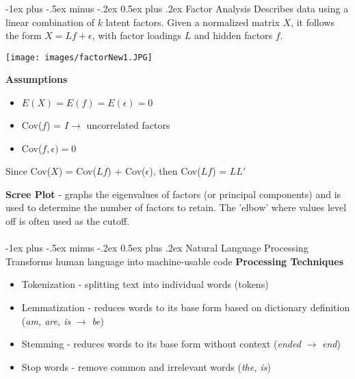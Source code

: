\documentclass[10pt,landscape]{article}
\makeatletter
\renewcommand{\section}{\@startsection{section}{1}{0mm}%
                                {-1ex plus -.5ex minus -.2ex}%
                                {0.5ex plus .2ex}%
                                {\normalfont\large\bfseries}}
\renewcommand{\subsection}{\@startsection{subsection}{2}{0mm}%
                                {-1ex plus -.5ex minus -.2ex}%
                                {0.5ex plus .2ex}%
                                {\normalfont\normalsize\bfseries}}
\makeatother
\begin{document}
\begin{multicols}{3}
\subsection{Factor Analysis}
Describes data using a linear combination of $k$ latent factors. 
Given a normalized matrix $X$, it follows the form  $X = Lf + \epsilon$,  with factor loadings $L$ and hidden factors $f$. 

\begin{center}
    \texttt{[image: images/factorNew1.JPG]}
\end{center}
\vspace{-2mm}
\textbf{Assumptions}
\begin{itemize}[label={--},leftmargin=4mm]
\itemsep -.4mm 
\item $E(X) = E(f) = E(\epsilon) = 0$
\item Cov($f$) = $I \to $ uncorrelated factors
\item Cov($f,\epsilon) = 0$
\end{itemize}

Since Cov($X$) = Cov($Lf$) + Cov($\epsilon$), then Cov($Lf$) = $LL'$

\smallskip
\textbf{Scree Plot} - graphs the eigenvalues of factors (or principal components) and is used to determine the number of factors to retain. The 'elbow' where values level off is often used as the cutoff.
\columnbreak
\\\textcolor{white}{.}\vspace{-5mm}\\ %
\section{Natural Language Processing}
Transforms human language into machine-usable code
\textbf{Processing Techniques}
\begin{itemize}[label={--},leftmargin=4mm]
\itemsep -.4mm 
\item Tokenization - splitting text into individual words (tokens)
\item Lemmatization - reduces words to its base form based on dictionary definition (\emph{am, are, is} $\to$ \emph{be})
\item Stemming - reduces words to its base form without context (\emph{ended} $\to$ \emph{end})
\item Stop words - remove common and irrelevant words (\emph{the, is})
\end{itemize}   


\end{multicols}
\end{document}
